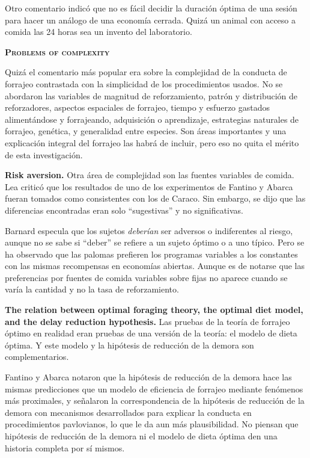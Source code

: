 \documentclass[a4paper,12pt]{article}
\begin{document}
Otro comentario indicó que no es fácil decidir la duración óptima de una sesión para hacer un análogo de una economía cerrada. Quizá un animal con acceso a comida las 24 horas sea un invento del laboratorio.

{\scshape\bfseries Problems of complexity}

Quizá el comentario más popular era sobre la complejidad de la conducta de forrajeo contrastada con la simplicidad de los procedimientos usados. No se abordaron las variables de magnitud de reforzamiento, patrón y distribución de reforzadores, aspectos espaciales de forrajeo, tiempo y esfuerzo gastados alimentándose y forrajeando, adquisición o aprendizaje, estrategias naturales de forrajeo, genética, y generalidad entre especies. Son áreas importantes y una explicación integral del forrajeo las habrá de incluir, pero eso no quita el mérito de esta investigación.

{\bfseries Risk aversion.} Otra área de complejidad son las fuentes variables de comida. Lea criticó que los resultados de uno de los experimentos de Fantino y Abarca fueran tomados como consistentes con los de Caraco. Sin embargo, se dijo que las diferencias encontradas eran solo ``sugestivas'' y no significativas.

Barnard especula que los sujetos {\itshape deberían} ser adversos o indiferentes al riesgo, aunque no se sabe si ``deber'' se refiere a un sujeto óptimo o a uno típico. Pero se ha observado que las palomas prefieren los programas variables a los constantes con las mismas recompensas en economías abiertas. Aunque es de notarse que las preferencias por fuentes de comida variables sobre fijas no aparece cuando se varía la cantidad y no la tasa de reforzamiento.

{\bfseries The relation between optimal foraging theory, the optimal diet model, and the delay reduction hypothesis.} Las pruebas de la teoría de forrajeo óptimo en realidad eran pruebas de una versión de la teoría: el modelo de dieta óptima. Y este modelo y la hipótesis de reducción de la demora son complementarios. 

Fantino y Abarca notaron que la hipótesis de reducción de la demora hace las mismas predicciones que un modelo de eficiencia de forrajeo mediante fenómenos más proximales, y señalaron la correspondencia de la hipótesis de reducción de la demora con mecanismos desarrollados para explicar la conducta en procedimientos pavlovianos, lo que le da aun más plausibilidad. No piensan que hipótesis de reducción de la demora ni el modelo de dieta óptima den una historia completa por sí mismos.
\end{document}
